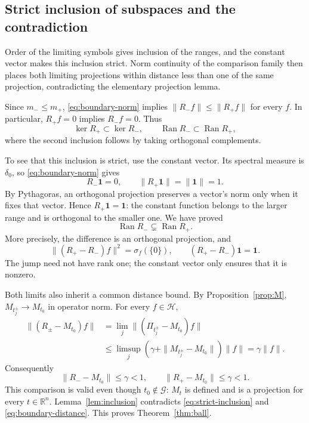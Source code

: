 \documentclass[a4paper,12pt,reqno]{amsart}
\newcommand{\lead}[1]{\par\smallskip\noindent\leavevmode#1\par\smallskip}
\theoremstyle{remark}
\numberwithin{equation}{section}
\newcommand{\R}{\mathbb R}
\newcommand{\Hh}{\mathcal H}
\newcommand{\one}{\mathbf 1}
\DeclareMathOperator{\Ran}{Ran}
\begin{document}
\subsection{Strict inclusion of subspaces and the contradiction}

\lead{Order of the limiting symbols gives inclusion of the ranges, and
the constant vector makes this inclusion strict. Norm continuity of the
comparison family then places both limiting projections within distance
less than one of the same projection, contradicting the elementary
projection lemma.}


Since $m_-\leq m_+$, \eqref{eq:boundary-norm} implies
$\|R_-f\|\leq\|R_+f\|$ for every $f$.  In particular,
$R_+f=0$ implies $R_-f=0$.  Thus
\[
 \ker R_+\subset\ker R_-,\qquad
 \Ran R_-\subset\Ran R_+,
\]
where the second inclusion follows by taking orthogonal complements.

To see that this inclusion is strict, use the constant vector.  Its
spectral measure is $\delta_0$, so \eqref{eq:boundary-norm} gives
\[
 R_-\one=0,\qquad \|R_+\one\|=\|\one\|=1.
\]
By Pythagoras, an orthogonal projection preserves a vector's norm only
when it fixes that vector.  Hence $R_+\one=\one$: the constant
function belongs to the larger range and is orthogonal to the smaller
one.  We have proved
\begin{equation}\label{eq:strict-inclusion}
 \Ran R_-\subsetneq\Ran R_+.
\end{equation}
More precisely, the difference is an orthogonal projection, and
\begin{equation}\label{eq:zero-frequency-jump}
 \|(R_+-R_-)f\|^2=\sigma_f(\{0\}),\qquad
 (R_+-R_-)\one=\one.
\end{equation}
The jump need not have rank one; the constant vector only ensures that
it is nonzero.


Both limits also inherit a common distance bound. By
Proposition~\ref{prop:M}, $M_{t_j^\pm}\to M_{t_0}$ in operator norm.
For every $f\in\Hh$,
\begin{align*}
 \|(R_\pm-M_{t_0})f\|
 &=\lim_j\|(\Pi_{t_j^\pm}-M_{t_0})f\|\\
 &\leq\limsup_j\left(\gamma+\|M_{t_j^\pm}-M_{t_0}\|\right)\|f\|
 =\gamma\|f\|.
\end{align*}
Consequently
\begin{equation}\label{eq:boundary-distance}
 \|R_--M_{t_0}\|\leq\gamma<1,\qquad
 \|R_+-M_{t_0}\|\leq\gamma<1.
\end{equation}
This comparison is valid even though $t_0\notin\mathcal G$: $M_t$ is
defined and is a projection for every $t\in\R^n$.
Lemma~\ref{lem:inclusion} contradicts \eqref{eq:strict-inclusion} and
\eqref{eq:boundary-distance}. This proves Theorem~\ref{thm:ball}.
\end{document}
